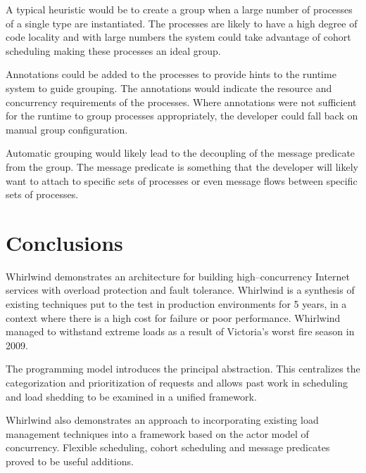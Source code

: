 \documentclass[conference]{IEEEtran}
\begin{document}
A typical heuristic would be to create a group when a large number of processes of a single type are instantiated. The processes are likely to have a high degree of code locality and with large numbers the system could take advantage of cohort scheduling making these processes an ideal group.

Annotations could be added to the processes to provide hints to the runtime system to guide grouping. The annotations would indicate the resource and concurrency requirements of the processes. Where annotations were not sufficient for the runtime to group processes appropriately, the developer could fall back on manual group configuration.

Automatic grouping would likely lead to the decoupling of the message predicate from the group. The message predicate is something that the developer will likely want to attach to specific sets of processes or even message flows between specific sets of processes.

\section{Conclusions}

Whirlwind demonstrates an architecture for building high--concurrency Internet services with overload protection and fault tolerance. Whirlwind is a synthesis of existing techniques put to the test in production environments for 5 years, in a context where there is a high cost for failure or poor performance. Whirlwind managed to withstand extreme loads as a result of Victoria's worst fire season in 2009.

The programming model introduces the principal abstraction. This centralizes the categorization and prioritization of requests and allows past work in scheduling and load shedding to be examined in a unified framework.

Whirlwind also demonstrates an approach to incorporating existing load management techniques into a framework based on the actor model of concurrency. Flexible scheduling, cohort scheduling and message predicates proved to be useful additions.



\end{document}
